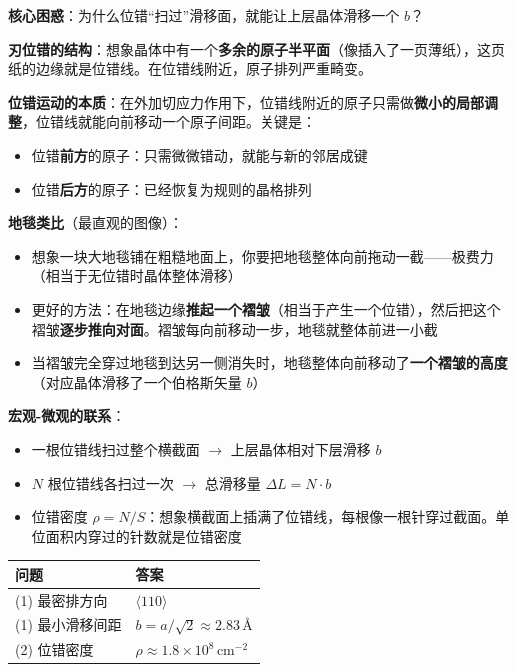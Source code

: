 \begin{insightbox}[物理图像：一条位错扫过 = 滑移一个原子间距]
\textbf{核心困惑}：为什么位错``扫过''滑移面，就能让上层晶体滑移一个 $b$？

\textbf{刃位错的结构}：想象晶体中有一个\textbf{多余的原子半平面}（像插入了一页薄纸），这页纸的边缘就是位错线。在位错线附近，原子排列严重畸变。

\textbf{位错运动的本质}：在外加切应力作用下，位错线附近的原子只需做\textbf{微小的局部调整}，位错线就能向前移动一个原子间距。关键是：
\begin{itemize}
    \item 位错\textbf{前方}的原子：只需微微错动，就能与新的邻居成键
    \item 位错\textbf{后方}的原子：已经恢复为规则的晶格排列
\end{itemize}

\textbf{地毯类比}（最直观的图像）：
\begin{itemize}
    \item 想象一块大地毯铺在粗糙地面上，你要把地毯整体向前拖动一截——极费力（相当于无位错时晶体整体滑移）
    \item 更好的方法：在地毯边缘\textbf{推起一个褶皱}（相当于产生一个位错），然后把这个褶皱\textbf{逐步推向对面}。褶皱每向前移动一步，地毯就整体前进一小截
    \item 当褶皱完全穿过地毯到达另一侧消失时，地毯整体向前移动了\textbf{一个褶皱的高度}（对应晶体滑移了一个伯格斯矢量 $b$）
\end{itemize}

\textbf{宏观-微观的联系}：
\begin{itemize}
    \item 一根位错线扫过整个横截面 $\rightarrow$ 上层晶体相对下层滑移 $b$
    \item $N$ 根位错线各扫过一次 $\rightarrow$ 总滑移量 $\Delta L = N\cdot b$
    \item 位错密度 $\rho = N/S$：想象横截面上插满了位错线，每根像一根针穿过截面。单位面积内穿过的针数就是位错密度
\end{itemize}
\end{insightbox}

\begin{formulabox}[答案汇总]
\begin{center}
\begin{tabular}{ll}
\toprule
\textbf{问题} & \textbf{答案} \\
\midrule
(1) 最密排方向 & $\langle 110\rangle$ \\
(1) 最小滑移间距 & $b = a/\sqrt{2} \approx 2.83\,\text{\AA}$ \\
(2) 位错密度 & $\rho \approx 1.8\times 10^{8}\,\mathrm{cm^{-2}}$ \\
\bottomrule
\end{tabular}
\end{center}
\end{formulabox}

